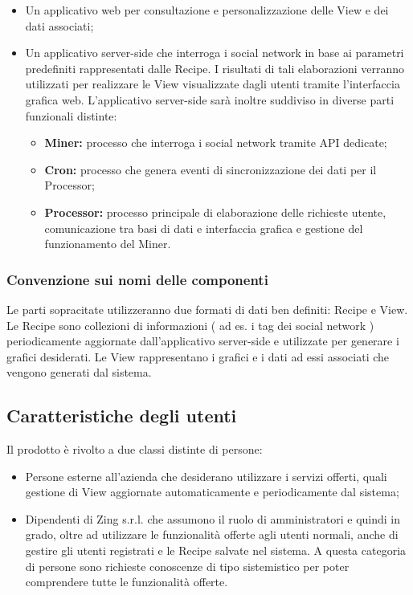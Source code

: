 \begin{itemize}
\item Un applicativo web per consultazione e personalizzazione delle View e dei dati associati;
\item Un applicativo server-side che interroga i social network in base ai parametri predefiniti rappresentati dalle Recipe. I risultati di tali elaborazioni verranno utilizzati per realizzare le View visualizzate dagli utenti tramite l'interfaccia grafica web.
  L'applicativo server-side sarà inoltre suddiviso in diverse parti funzionali distinte:
  \begin{itemize}
    \item \textbf{Miner:} processo che interroga i social network tramite API dedicate;
    \item \textbf{Cron:} processo che genera eventi di sincronizzazione dei dati per il Processor;
    \item \textbf{Processor:} processo principale di elaborazione delle richieste utente, comunicazione tra basi di dati e interfaccia grafica e gestione del funzionamento del Miner.
  \end{itemize}
\end{itemize}

\subsubsection{Convenzione sui nomi delle componenti}
Le parti sopracitate utilizzeranno due formati di dati ben definiti: Recipe e View.
Le Recipe sono collezioni di informazioni ( ad es. i tag dei social network ) periodicamente aggiornate dall'applicativo server-side e utilizzate per generare i grafici desiderati. \newline
Le View rappresentano i grafici e i dati ad essi associati che vengono generati dal sistema.

\subsection{Caratteristiche degli utenti}
Il prodotto è rivolto a due classi distinte di persone:

\begin{itemize}
  \item Persone esterne all'azienda che desiderano utilizzare i servizi offerti, quali gestione di View aggiornate automaticamente e periodicamente dal sistema;
  \item Dipendenti di Zing s.r.l. che assumono il ruolo di amministratori e quindi in grado, oltre ad utilizzare le funzionalità offerte agli utenti normali, anche di gestire gli utenti registrati e le Recipe salvate nel sistema.
  A questa categoria di persone sono richieste conoscenze di tipo sistemistico per poter comprendere tutte le funzionalità offerte.
\end{itemize}



